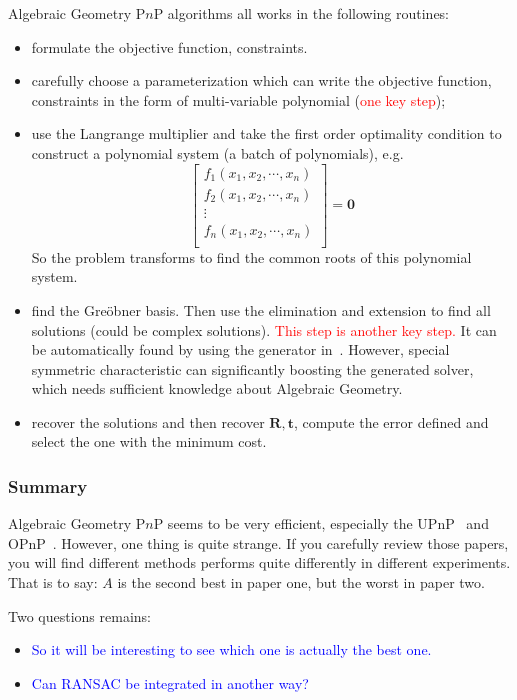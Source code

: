 \documentclass[a4paper]{report}
\begin{document}
Algebraic Geometry P$n$P algorithms all works in the following routines:
\begin{itemize}
\item formulate the objective function, constraints.
\item carefully choose a parameterization which can write the objective function, constraints in the form of multi-variable polynomial (\textcolor{red}{one key step});
\item use the Langrange multiplier and take the first order optimality condition to construct a polynomial system (a batch of polynomials), e.g. 
$$
\left[ 
\begin{matrix}
f_1(x_1,x_2,\cdots,x_n) \\
f_2(x_1,x_2,\cdots,x_n) \\
\vdots \\
f_n(x_1,x_2,\cdots,x_n) \\
\end{matrix}
\right]=\mathbf{0}
$$
So the problem transforms to find the common roots of this polynomial system. 
\item find the Gre\"obner basis. Then use the elimination and extension to find all solutions (could be complex solutions). \textcolor{red}{This step is another key step.} It can be automatically found by using the generator in~\cite{kukelova2008automatic}. However, special symmetric characteristic can significantly boosting the generated solver, which needs sufficient knowledge about Algebraic Geometry.
\item recover the solutions and then recover $\mathbf{R,t}$, compute the error defined and select the one with the minimum cost.
\end{itemize}

\subsubsection{Summary}
Algebraic Geometry P$n$P seems to be very efficient, especially the UPnP~\cite{kneip2014upnp} and OPnP~\cite{zheng2013revisiting}. However, one thing is quite strange. If you carefully review those papers, you will find different methods performs quite differently in different experiments. That is to say: $A$ is the second best in paper one, but the worst in paper two. 

Two questions remains:
\begin{itemize}
\item \textcolor{blue}{So it will be interesting to see which one is actually the best one.} 
\item \textcolor{blue}{Can RANSAC be integrated in another way?}
\end{itemize}
\end{document}
